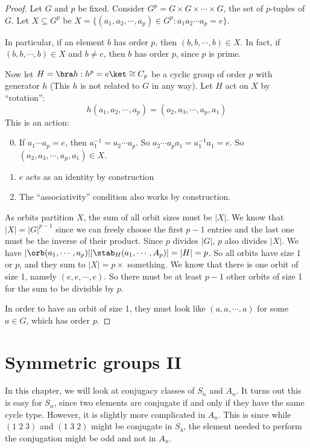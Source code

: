 \documentclass[a4paper]{article}
\begin{document}
\begin{proof}
  Let $G$ and $p$ be fixed. Consider $G^p = G\times G\times \cdots \times G$, the set of $p$-tuples of $G$. Let $X \subseteq G^p$ be $X = \{(a_1, a_2, \cdots, a_p)\in G^p: a_1a_2\cdots a_p = e\}$.

  In particular, if an element $b$ has order $p$, then $(b, b, \cdots, b)\in X$. In fact, if $(b, b, \cdots, b)\in X$ and $b\not= e$, then $b$ has order $p$, since $p$ is prime.

  Now let $H = \bra h: h^p = e\ket\cong C_p$ be a cyclic group of order $p$ with generator $h$ (This $h$ is not related to $G$ in any way). Let $H$ act on $X$ by ``rotation'':
  \[
    h(a_1, a_2, \cdots, a_p) = (a_2, a_3, \cdots, a_p, a_1)
  \]
  This is an action:
  \begin{enumerate}[label=\arabic{*}.]
      \setcounter{enumi}{-1}
    \item If $a_1\cdots a_p = e$, then $a_1^{-1} = a_2\cdots a_p$. So $a_2\cdots a_pa_1 = a_1^{-1}a_1 = e$. So $(a_2, a_3, \cdots, a_p, a_1)\in X$.
    \item $e$ acts as an identity by construction
    \item The ``associativity'' condition also works by construction.
  \end{enumerate}

  As orbits partition $X$, the sum of all orbit sizes must be $|X|$. We know that $|X| = |G|^{p - 1}$ since we can freely choose the first $p - 1$ entries and the last one must be the inverse of their product. Since $p$ divides $|G|$, $p$ also divides $|X|$. We have $|\orb(a_1, \cdots , a_p)||\stab_H(a_1, \cdots, A_p)| = |H| = p$. So all orbits have size 1 or $p$, and they sum to $|X| = p\times$ something. We know that there is one orbit of size 1, namely $(e, e, \cdots, e)$. So there must be at least $p - 1$ other orbits of size 1 for the sum to be divisible by $p$.

  In order to have an orbit of size 1, they must look like ${(a, a, \cdots, a)}$ for some $a\in G$, which has order $p$.
\end{proof}

\section{Symmetric groups II}
In this chapter, we will look at conjugacy classes of $S_n$ and $A_n$. It turns out this is easy for $S_n$, since two elements are conjugate if and only if they have the same cycle type. However, it is slightly more complicated in $A_n$. This is since while $(1\; 2\; 3)$ and $(1\; 3\; 2)$ might be conjugate in $S_4$, the element needed to perform the conjugation might be odd and not in $A_n$.
\end{document}
